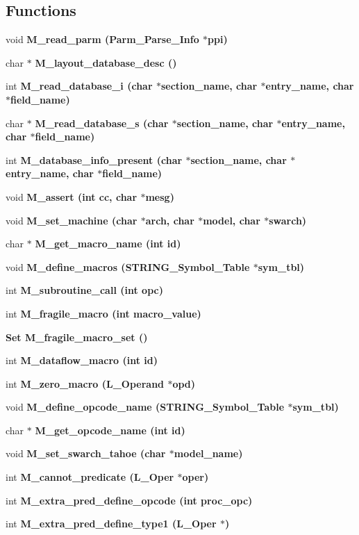 \subsection*{Functions}
\begin{CompactItemize}
\item 
void \bf{M\_\-read\_\-parm} (\bf{Parm\_\-Parse\_\-Info} $\ast$ppi)
\item 
char $\ast$ \bf{M\_\-layout\_\-database\_\-desc} ()
\item 
int \bf{M\_\-read\_\-database\_\-i} (char $\ast$section\_\-name, char $\ast$entry\_\-name, char $\ast$field\_\-name)
\item 
char $\ast$ \bf{M\_\-read\_\-database\_\-s} (char $\ast$section\_\-name, char $\ast$entry\_\-name, char $\ast$field\_\-name)
\item 
int \bf{M\_\-database\_\-info\_\-present} (char $\ast$section\_\-name, char $\ast$entry\_\-name, char $\ast$field\_\-name)
\item 
void \bf{M\_\-assert} (int cc, char $\ast$mesg)
\item 
void \bf{M\_\-set\_\-machine} (char $\ast$arch, char $\ast$model, char $\ast$swarch)
\item 
char $\ast$ \bf{M\_\-get\_\-macro\_\-name} (int id)
\item 
void \bf{M\_\-define\_\-macros} (\bf{STRING\_\-Symbol\_\-Table} $\ast$sym\_\-tbl)
\item 
int \bf{M\_\-subroutine\_\-call} (int opc)
\item 
int \bf{M\_\-fragile\_\-macro} (int macro\_\-value)
\item 
\bf{Set} \bf{M\_\-fragile\_\-macro\_\-set} ()
\item 
int \bf{M\_\-dataflow\_\-macro} (int id)
\item 
int \bf{M\_\-zero\_\-macro} (L\_\-Operand $\ast$opd)
\item 
void \bf{M\_\-define\_\-opcode\_\-name} (\bf{STRING\_\-Symbol\_\-Table} $\ast$sym\_\-tbl)
\item 
char $\ast$ \bf{M\_\-get\_\-opcode\_\-name} (int id)
\item 
void \bf{M\_\-set\_\-swarch\_\-tahoe} (char $\ast$model\_\-name)
\item 
int \bf{M\_\-cannot\_\-predicate} (L\_\-Oper $\ast$oper)
\item 
int \bf{M\_\-extra\_\-pred\_\-define\_\-opcode} (int proc\_\-opc)
\item 
int \bf{M\_\-extra\_\-pred\_\-define\_\-type1} (L\_\-Oper $\ast$)
\item 

\end{CompactItemize}
